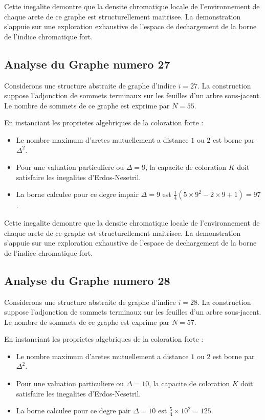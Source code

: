 \documentclass[11pt,a4paper]{article}
\begin{document}
Cette inegalite demontre que la densite chromatique locale de l'environnement de chaque arete de ce graphe est structurellement maitrisee. La demonstration s'appuie sur une exploration exhaustive de l'espace de dechargement de la borne de l'indice chromatique fort.

\subsection{Analyse du Graphe numero 27}
Considerons une structure abstraite de graphe d'indice $i = 27$. La construction suppose l'adjonction de sommets terminaux sur les feuilles d'un arbre sous-jacent. Le nombre de sommets de ce graphe est exprime par $N = 55$.

En instanciant les proprietes algebriques de la coloration forte :
\begin{itemize}
\item Le nombre maximum d'aretes mutuellement a distance $1$ ou $2$ est borne par $\Delta^2$.
\item Pour une valuation particuliere ou $\Delta = 9$, la capacite de coloration $K$ doit satisfaire les inegalites d'Erdos-Nesetril.
\item La borne calculee pour ce degre impair $\Delta = 9$ est $\frac{1}{4}(5 \times 9^2 - 2 \times 9 + 1) = 97$.
\end{itemize}

Cette inegalite demontre que la densite chromatique locale de l'environnement de chaque arete de ce graphe est structurellement maitrisee. La demonstration s'appuie sur une exploration exhaustive de l'espace de dechargement de la borne de l'indice chromatique fort.

\subsection{Analyse du Graphe numero 28}
Considerons une structure abstraite de graphe d'indice $i = 28$. La construction suppose l'adjonction de sommets terminaux sur les feuilles d'un arbre sous-jacent. Le nombre de sommets de ce graphe est exprime par $N = 57$.

En instanciant les proprietes algebriques de la coloration forte :
\begin{itemize}
\item Le nombre maximum d'aretes mutuellement a distance $1$ ou $2$ est borne par $\Delta^2$.
\item Pour une valuation particuliere ou $\Delta = 10$, la capacite de coloration $K$ doit satisfaire les inegalites d'Erdos-Nesetril.
\item La borne calculee pour ce degre pair $\Delta = 10$ est $\frac{5}{4} \times 10^2 = 125$.
\end{itemize}
\end{document}
